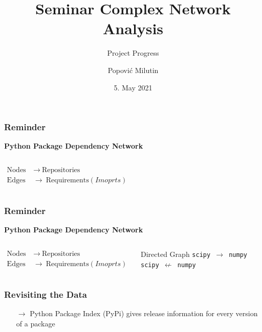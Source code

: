 \documentclass[fleqn]{beamer}
\title
{Seminar Complex Network Analysis}
\subtitle{Project Progress}
\author[Popović Milutin]
{Popović Milutin}
\date{5. May 2021}
\begin{document}
    \begin{frame}
        \titlepage
    \end{frame}

    \begin{frame}
        \frametitle{Reminder}
        \centering
        \textbf{Python Package Dependency Network}
        \vspace{1cm}
        \begin{columns}[T]
        \begin{align*}
            \text{Nodes}\ &\to\  \text{Repositories}\\
            \text{Edges}\ &\to\ \text{Requirements}(Imoprts)
        \end{align*}
        \end{columns}
    \end{frame}

    \begin{frame}
        \frametitle{Reminder}
        \centering
        \textbf{Python Package Dependency Network}
        \vspace{1cm}
        \begin{columns}[T]
        \begin{align*}
            \text{Nodes}\ &\to\  \text{Repositories}\\
            \text{Edges}\ &\to\ \text{Requirements}(Imoprts)
        \end{align*}
        \begin{block}{\centering Directed Graph}
            \centering \texttt{scipy $\to$ numpy}\\
            \centering \texttt{scipy $\not\gets$ numpy}
        \end{block}
        \end{columns}
    \end{frame}

    \begin{frame}
        \frametitle{Revisiting the Data}
        \begin{itemize}
            \item[$\to$] Python Package Index (PyPi) gives release
                information for every version of a package
        \end{itemize}
        \vspace{6cm}
    \end{frame}
\end{document}
